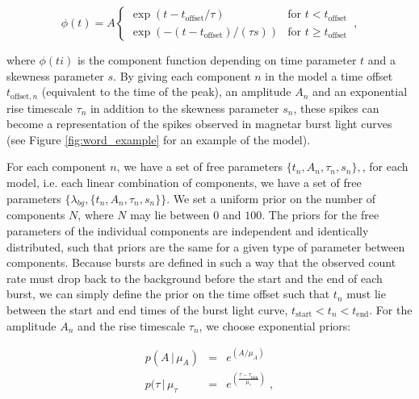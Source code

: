 \documentclass[12pt]{emulateapj}
\newcommand{\given}{\,|\,}
\newcommand{\dd}{\mathrm{d}}
\newcommand{\counts}{y}
\newcommand{\pars}{\theta}
\newcommand{\mean}{\lambda}
\newcommand{\Poisson}{{\mathcal P}}
\newcommand{\bg}{\mathrm{bg}}
\newcommand{\word}{\phi}
\begin{document}
\begin{equation}
\word(t) = A \left\{\begin{array}{ll}\exp(t-t_{\mathrm{offset}}/\tau) & \mbox{for $t < t_{\mathrm{offset}}$}\\ 
\exp(-(t-t_{\mathrm{offset}})/(\tau s)) & \mbox{for $t \geq t_\mathrm{offset}$}\end{array}\right. \, ,
\label{eqn:word}
\end{equation}

where $\word(ti)$ is the component function depending on time parameter $t$ and a skewness
parameter $s$. By giving each component $n$ in the model a time offset $t_{\mathrm{offset},n}$ (equivalent to the time of the peak), 
an amplitude $A_n$ and an exponential rise timescale $\tau_n$ in addition to the skewness parameter $s_n$, 
these spikes can become a representation of the spikes observed in magnetar burst light curves (see Figure \ref{fig:word_example}
for an example of the model).


For each component $n$, we have a set of free parameters $\{t_n, A_n, \tau_n, s_n \},$, for each model, i.e. each
linear combination of components, we have a set of free parameters $\{\mean_{bg}, \{t_n, A_n, \tau_n, s_n\} \}$.
We set a uniform prior on the number of components $N$, where $N$ may lie between $0$ and $100$. 
The priors for the free parameters of the individual components are independent and identically distributed, such that priors 
are the same for a given type of parameter between components. 
Because bursts are defined in such a way that the observed count rate must drop back to the background before the
start and the end of each burst, we can simply define the prior on the time offset such that $t_n$ must lie between
the start and end times of the burst light curve, $t_{\mathrm{start}} < t_n < t_\mathrm{end}$. 
For the amplitude $A_n$ and the rise timescale $\tau_n$, we choose exponential priors:

\begin{eqnarray}
p(A \given \mu_A) &=& e^{(A/\mu_A)} \\
p(\tau \given \mu_{\tau} & = & e^{(\frac{\tau - \tau_{\mathrm{min}}}{\mu_{\mathrm{\tau}}})} \; ,
\end{eqnarray}
\end{document}
